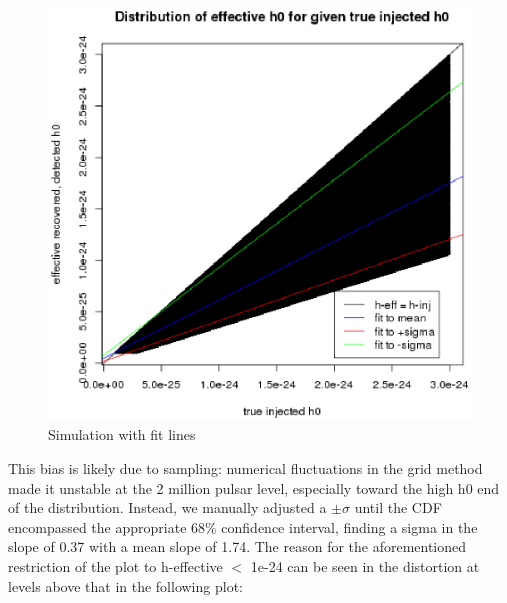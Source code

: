 \begin{figure}
\begin{center}
\includegraphics[width=0.3\paperwidth,height=0.2\paperheight]{PlotHEffVsH0TrueWithLines.eps}
\caption{Simulation with fit lines
}
\end{center}
\end{figure}


This bias is likely due to sampling: numerical fluctuations in the grid method made it unstable at the 2 million pulsar level, especially toward the high h0 end of the distribution. Instead, we manually adjusted a $\pm \sigma$ until the CDF encompassed the appropriate 68\% confidence interval, finding a sigma in the slope of 0.37 with a mean slope of 1.74. The reason for the aforementioned restriction of the plot to h-effective $<$ 1e-24 can be seen in the distortion at levels above that in the following plot:

